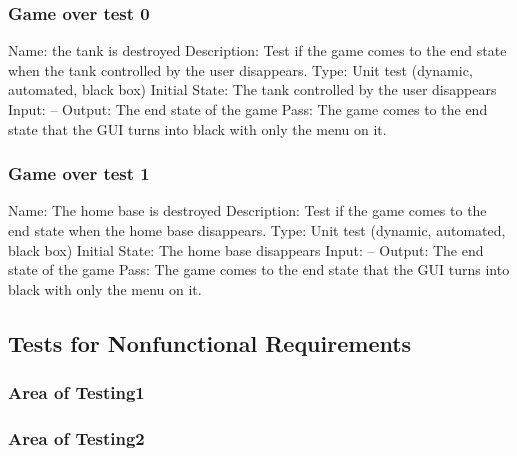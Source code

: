 \documentclass{article}
\begin{document}
\subsubsection{Game over test 0}
Name:  the tank is destroyed\newline
Description: Test if the game comes to the end state when the tank controlled by the user disappears. \newline
Type: Unit test (dynamic, automated, black box) \newline
Initial State:  The tank controlled by the user disappears\newline
Input: --\newline
Output: The end state of the game \newline
Pass:  The game comes to the end state that the GUI turns into black with only the menu on it. \newline

\subsubsection{Game over test 1}
Name:  The home base is destroyed\newline
Description: Test if the game comes to the end state when the home base disappears. \newline
Type: Unit test (dynamic, automated, black box) \newline
Initial State:  The home base disappears \newline
Input: --\newline
Output: The end state of the game \newline
Pass:  The game comes to the end state that the GUI turns into black with only the menu on it. \newline





\subsection{Tests for Nonfunctional Requirements}
\subsubsection{Area of Testing1}
\subsubsection{Area of Testing2}
\end{document}
